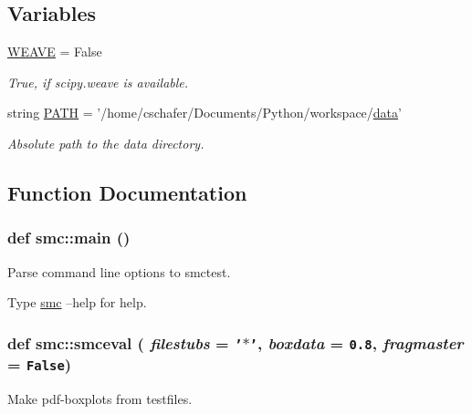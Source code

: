 \subsection*{Variables}
\begin{CompactItemize}
\item 
\hyperlink{namespacesmc_fa23f48b546729c612828f8c434748d3}{WEAVE} = False
\begin{CompactList}\small\item\em True, if scipy.weave is available. \item\end{CompactList}\item 
string \hyperlink{namespacesmc_e5f7d905ee9ecc1f072955328a069bba}{PATH} = '/home/cschafer/Documents/Python/workspace/\hyperlink{classsampling_1_1data}{data}'
\begin{CompactList}\small\item\em Absolute path to the data directory. \item\end{CompactList}\end{CompactItemize}


\subsection{Function Documentation}
\hypertarget{namespacesmc_060a055567983af558dd15bda3d5a7be}{
\subsubsection[{main}]{\setlength{\rightskip}{0pt plus 5cm}def smc::main ()}}
\label{namespacesmc_060a055567983af558dd15bda3d5a7be}


Parse command line options to smctest. 

Type \hyperlink{namespacesmc}{smc} --help for help. \hypertarget{namespacesmc_e7960431b019652bb6041acbe319314a}{
\subsubsection[{smceval}]{\setlength{\rightskip}{0pt plus 5cm}def smc::smceval ( {\em filestubs} = {\tt '$\ast$'}, \/   {\em boxdata} = {\tt 0.8}, \/   {\em fragmaster} = {\tt False})}}
\label{namespacesmc_e7960431b019652bb6041acbe319314a}


Make pdf-boxplots from testfiles. 

